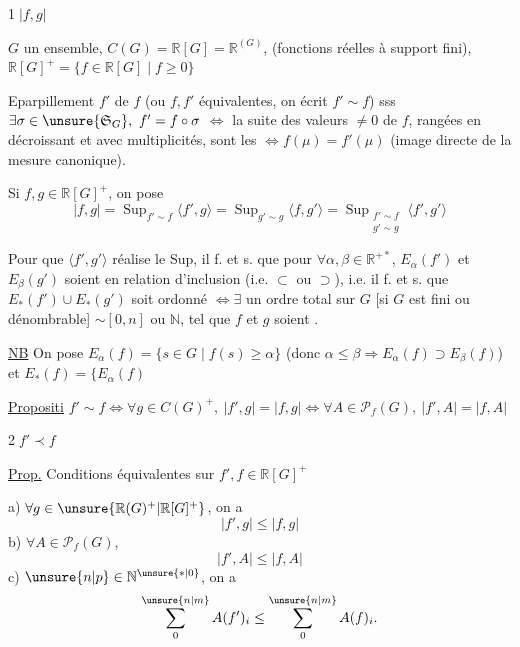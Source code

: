 \textcircled{1}\quad $|f,g|$

 $G$ un ensemble, $C(G)=\mathbb R[G]=\mathbb R^{(G)}$, (fonctions réelles à support fini), $\mathbb R[G]^+=\{f\in\mathbb R[G]\mid f\geq0\}$

 Eparpillement $f'$ de $f$ (ou $f,f'$ équivalentes, on écrit $f'\sim f$) sss $\exists\sigma\in\unsure{\mathfrak S_G},\ f'=f\circ\sigma$ $\Longleftrightarrow$ la suite des valeurs $\ne0$ de $f$,  rangées en décroissant et avec multiplicités, sont les  $\Longleftrightarrow f(\mu)=f'(\mu)$ (image directe de la mesure canonique).

Si $f,g\in\mathbb R[G]^+$, on pose
\[
|f,g|=\operatorname{Sup}_{f'\sim f}\langle f',g\rangle
=\operatorname{Sup}_{g'\sim g}\langle f,g'\rangle
=\operatorname{Sup}_{\substack{f'\sim f\\g'\sim g}}\langle f',g'\rangle
\]

 Pour que $\langle f',g'\rangle$ réalise le Sup, il f. et s. que pour $\forall\alpha,\beta\in\mathbb R^{+\ast}$, $E_\alpha(f')$ et $E_\beta(g')$ soient en relation d'inclusion (i.e. $\subset$ ou $\supset$), i.e. il f. et s. que $E_\ast(f')\cup E_\ast(g')$ soit  ordonné $\Longleftrightarrow\exists$ un ordre total sur $G$ [si $G$ est fini ou dénombrable] $\sim[0,n]$ ou $\mathbb N$, tel que $f$ et $g$ soient .

\uline{NB} On pose $E_\alpha(f)=\{s\in G\mid f(s)\geq\alpha\}$ (donc $\alpha\leq\beta\Rightarrow E_\alpha(f)\supset E_\beta(f)$) et $E_\ast(f)=\{E_\alpha(f)$


\uline{Propositi} $f'\sim f\Longleftrightarrow\forall g\in C(G)^+,\ |f',g|=|f,g|\Longleftrightarrow\forall A\in\mathcal P_f(G),\ |f',A|=|f,A|$

\textcircled{2}\quad \uline{$f'\prec f$}

\uline{Prop.} Conditions équivalentes sur $f',f\in\mathbb R[G]^+$

a) $\forall g\in\unsure{\mathbb R(G)^+|\mathbb R[G]^+}$, on a
\[
|f',g|\leq|f,g|
\]
b) $\forall A\in\mathcal P_f(G)$, \unsure{$\ldots$}
\[
|f',A|\leq|f,A|
\]
c) \deleted{\unsure{$\forall$}} $\unsure{n|p}\in\mathbb N^{\unsure{\ast|0}}$, on a
\[
\sum_0^{\unsure{n|m}}A(f')_i\leq\sum_0^{\unsure{n|m}}A(f)_i.
\]
